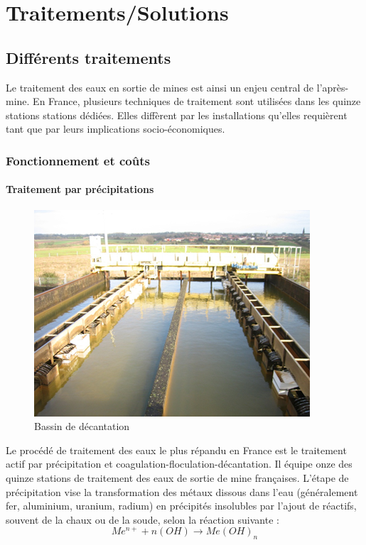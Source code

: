 \documentclass{article}
\begin{document}
\newpage
\section{Traitements/Solutions}
\subsection{Différents traitements}
Le traitement des eaux en sortie de mines est ainsi un enjeu central de l’après-mine. En France, plusieurs techniques de traitement sont utilisées dans les quinze stations stations dédiées. Elles diffèrent par les installations qu’elles requièrent tant que par leurs implications socio-économiques.

\subsubsection{Fonctionnement et coûts}
\paragraph{Traitement par précipitations} \hspace{1 em}




\begin{figure}[H]
\centering
\includegraphics[width = 0.5\linewidth]{III_A_1.png}
\caption{Bassin de décantation}
\label{fig:bassin_decantation}
\end{figure}



Le procédé de traitement des eaux le plus répandu en France est le traitement actif par précipitation et coagulation-floculation-décantation. Il équipe onze des quinze stations de traitement des eaux de sortie de mine françaises. 
L’étape de précipitation vise la transformation des métaux dissous dans l’eau (généralement fer, aluminium, uranium, radium) en précipités insolubles par l’ajout de réactifs, souvent de la chaux ou de la soude, selon la réaction suivante :   
$$Me^{n+} + n(OH) \rightarrow Me(OH)_{n}$$
          	
\end{document}
